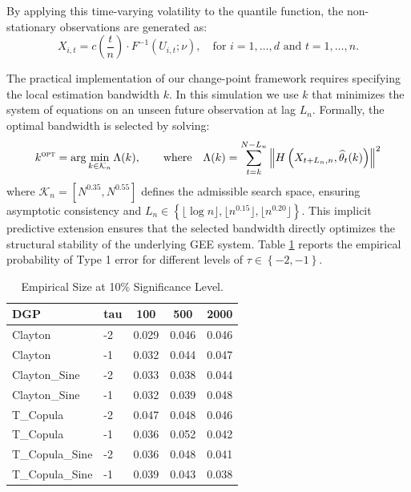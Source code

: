 \documentclass[12pt,a4paper]{article}
\theoremstyle{definition}
\theoremstyle{definition}
\theoremstyle{theorem}
\begin{document}
By applying this time-varying volatility to the quantile function, the non-stationary observations are generated as:
\begin{equation} \label{eq:dgp_time_varying}
    X_{i,t} = c\left(\frac{t}{n}\right) \cdot F^{-1}(U_{i,t}; \nu), \quad \text{for } i = 1, \dots, d \text{ and } t = 1, \dots, n.
\end{equation}


The practical implementation of our change-point framework requires specifying the local estimation bandwidth $k$. In this simulation we use $k$ that minimizes the system of equations on an unseen future observation at lag $L_n$. Formally, the optimal bandwidth is selected by solving:
\begin{equation}
    k^{\textsc{opt}} = \arg\min_{k \in \mathcal{K}_n} \Lambda(k), \qquad \text{where} \quad \Lambda(k) = \sum_{t=k}^{N - L_n} \left\| H\left(X_{t+L_n,n}, \widehat{\theta}_{t}(k)\right) \right\|^2
\end{equation}
where $\mathcal{K}_n = [N^{0.35}, N^{0.55}]$ defines the admissible search space, ensuring asymptotic consistency and $L_n \in \left\{ \lfloor \log n \rfloor, \lfloor n^{0.15} \rfloor, \lfloor n^{0.20} \rfloor \right\}$. This implicit predictive extension ensures that the selected bandwidth directly optimizes the structural stability of the underlying GEE system. Table \ref{tab:tab:empirical_size_10} reports the empirical probability of Type 1 error for different levels of $\tau \in \left\{-2, -1 \right\}$.

\begin{table}

\caption{\label{tab:tab:empirical_size_10}Empirical Size at 10\% Significance Level.}
\centering
\begin{tabular}[t]{llccc}
\toprule
DGP & tau & 100 & 500 & 2000\\
\midrule
Clayton & -2 & 0.029 & 0.046 & 0.046\\
Clayton & -1 & 0.032 & 0.044 & 0.047\\
Clayton\_Sine & -2 & 0.033 & 0.038 & 0.044\\
Clayton\_Sine & -1 & 0.032 & 0.039 & 0.048\\
T\_Copula & -2 & 0.047 & 0.048 & 0.046\\
\addlinespace
T\_Copula & -1 & 0.036 & 0.052 & 0.042\\
T\_Copula\_Sine & -2 & 0.036 & 0.048 & 0.041\\
T\_Copula\_Sine & -1 & 0.039 & 0.043 & 0.038\\
\bottomrule
\end{tabular}
\end{table}
\end{document}
